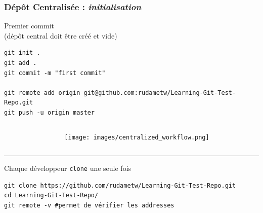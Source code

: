 \documentclass[table,tikz,12pt,svgnames]{beamer}
\begin{document}
\begin{frame}[fragile]
\frametitle{Dépôt Centralisée : \textit{initialisation}}
\begin{adjustwidth}{-2em}{0cm}{}
\color{darkgreen}%
\noindent
Premier commit \\ \small(dépôt central doit être créé et vide)
\color{black}
\end{adjustwidth}
\begin{adjustwidth}{-1em}{0cm}{}
\begin{verbatim}
git init .
git add .
git commit -m "first commit"

git remote add origin git@github.com:rudametw/Learning-Git-Test-Repo.git
git push -u origin master
\end{verbatim}
\end{adjustwidth}

\begin{adjustwidth}{-0cm}{0cm}{}
	\begin{columns}[T] %
		\begin{column}{.6\textwidth}
		\end{column}%
		\begin{column}{.3\textwidth}
			\color{black}
			\vspace{-11em}
			\begin{adjustwidth}{-0cm}{-3cm}{}
				\begin{figure}
					\hfill
					\texttt{[image: images/centralized\_workflow.png]}
				\end{figure}
			\end{adjustwidth}
		\end{column}%
	\end{columns}
	\vspace{-1em}
	\PAUSE
	\color{darkgray}\rule{\linewidth}{2pt}
	
	\begin{adjustwidth}{-0.5cm}{-3cm}{}
		\color{darkgreen}%
		Chaque développeur \texttt{clone} une seule fois
		\color{black}
		\begin{verbatim}
git clone https://github.com/rudametw/Learning-Git-Test-Repo.git
cd Learning-Git-Test-Repo/
git remote -v #permet de vérifier les addresses
		\end{verbatim}
		\end{adjustwidth}
	\end{adjustwidth}
\end{frame}
\end{document}
